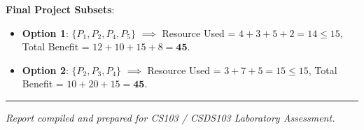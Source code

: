 \documentclass[12pt]{article}
\begin{document}
\textbf{Final Project Subsets}:
\begin{itemize}
    \item \textbf{Option 1}: $\{P_1, P_2, P_4, P_5\}$ $\implies$ Resource Used = $4 + 3 + 5 + 2 = 14 \le 15$, Total Benefit = $12 + 10 + 15 + 8 = \mathbf{45}$.
    \item \textbf{Option 2}: $\{P_2, P_3, P_4\}$ $\implies$ Resource Used = $3 + 7 + 5 = 15 \le 15$, Total Benefit = $10 + 20 + 15 = \mathbf{45}$.
\end{itemize}

\vspace{0.4cm}
\hrule
\vspace{0.2cm}
\begin{center}
\textit{Report compiled and prepared for CS103 / CSDS103 Laboratory Assessment.}
\end{center}
\end{document}
